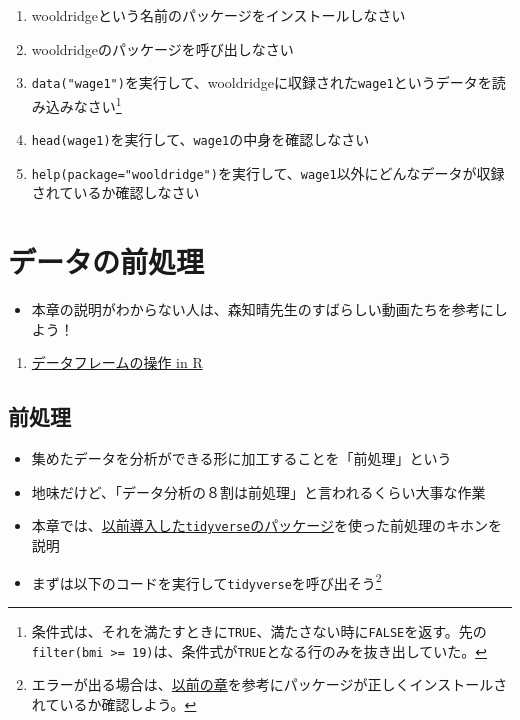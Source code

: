 \documentclass[
]{book}
\providecommand{\tightlist}{%
  \setlength{\itemsep}{0pt}\setlength{\parskip}{0pt}}
\begin{document}
\begin{enumerate}
\def\labelenumi{\arabic{enumi}.}
\tightlist
\item
  wooldridgeという名前のパッケージをインストールしなさい\\
\item
  wooldridgeのパッケージを呼び出しなさい\\
\item
  \texttt{data("wage1")}を実行して、wooldridgeに収録された\texttt{wage1}というデータを読み込みなさい\footnote{条件式は、それを満たすときに\texttt{TRUE}、満たさない時に\texttt{FALSE}を返す。先の\texttt{filter(bmi\ \textgreater{}=\ 19)}は、条件式が\texttt{TRUE}となる行のみを抜き出していた。}\\
\item
  \texttt{head(wage1)}を実行して、\texttt{wage1}の中身を確認しなさい\\
\item
  \texttt{help(package="wooldridge")}を実行して、\texttt{wage1}以外にどんなデータが収録されているか確認しなさい
\end{enumerate}

\hypertarget{ux30c7ux30fcux30bfux306eux524dux51e6ux7406}{%
\chapter{データの前処理}\label{ux30c7ux30fcux30bfux306eux524dux51e6ux7406}}

\begin{itemize}
\tightlist
\item
  本章の説明がわからない人は、森知晴先生のすばらしい動画たちを参考にしよう！
\end{itemize}

\begin{enumerate}
\def\labelenumi{\arabic{enumi}.}
\tightlist
\item
  \href{https://youtu.be/96AZJmGNass}{データフレームの操作 in R}
\end{enumerate}

\hypertarget{ux524dux51e6ux7406}{%
\section{前処理}\label{ux524dux51e6ux7406}}

\begin{itemize}
\tightlist
\item
  集めたデータを分析ができる形に加工することを「前処理」という
\item
  地味だけど、「データ分析の８割は前処理」と言われるくらい大事な作業
\item
  本章では、\protect\hyperlink{ux30d1ux30c3ux30b1ux30fcux30b8ux306eux30a4ux30f3ux30b9ux30c8ux30fcux30eb}{以前導入した\texttt{tidyverse}のパッケージ}を使った前処理のキホンを説明
\item
  まずは以下のコードを実行して\texttt{tidyverse}を呼び出そう\footnote{エラーが出る場合は、\protect\hyperlink{ux30d1ux30c3ux30b1ux30fcux30b8ux306eux30a4ux30f3ux30b9ux30c8ux30fcux30eb}{以前の章}を参考にパッケージが正しくインストールされているか確認しよう。}
\end{itemize}
\end{document}

